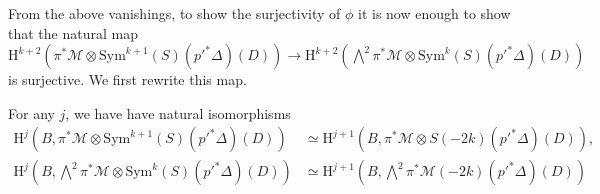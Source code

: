 From the above vanishings, to show the surjectivity of $\phi$ it is now enough to show that the natural map $\mathrm{H}^{k+2}(\pi^*\mathcal{M} \otimes \mathrm{Sym}^{k+1}(S)({p'}^*\Delta)(D)) \to \mathrm{H}^{k+2}(\bigwedge^2 \pi^*\mathcal{M} \otimes \mathrm{Sym}^{k}(S)({p'}^*\Delta)(D))$ is surjective. We first rewrite this map.
\begin{lem}
\notready \label{identilem}
For any $j$, we have have natural isomorphisms
{\small{
\begin{align*}
\mathrm{H}^j(B, \pi^* \mathcal{M} \otimes \mathrm{Sym}^{k+1}(S)({p'}^*\Delta)(D))&\simeq \mathrm{H}^{j+1}(B, \pi^* \mathcal{M} \otimes S(-2k)({p'}^*\Delta)(D)), \\
\mathrm{H}^{j}(B,\bigwedge^{2}\pi^*\mathcal{M}  \otimes \mathrm{Sym}^k(S)({p'}^*\Delta)(D))&\simeq \mathrm{H}^{j+1}(B,\bigwedge^{2}\pi^*\mathcal{M}(-2k)({p'}^*\Delta)(D))
\end{align*}
}}
\end{lem}
